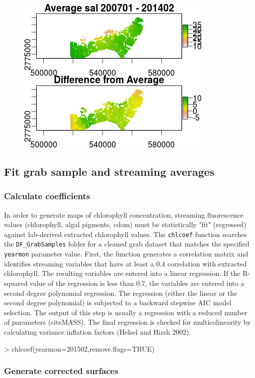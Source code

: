\documentclass[12pt]{article}
\begin{document}
\begin{figure}[H]
\begin{center}
\includegraphics{figure2}
\end{center}
\label{fig:two}
\end{figure}

\subsection{Fit grab sample and streaming averages}
\subsubsection{Calculate coefficients}

In order to generate maps of chlorophyll concentration, streaming fluorescence values (chlorophyll, algal pigments, cdom) must be statistically "fit" (regressed) against lab-derived extracted chlorophyll values. The \texttt{chlcoef} function searches the \verb|DF_GrabSamples| folder for a cleaned grab dataset that matches the specified \texttt{yearmon} parameter value. First, the function generates a correlation matrix and identifies streaming variables that have at least a 0.4 correlation with extracted chlorophyll. The resulting variables are entered into a linear regression. If the R-squared value of the regression is less than 0.7, the variables are entered into a second degree polynomial regression. The regression (either the linear or the second degree polynomial) is subjected to a backward stepwise AIC model selection. The output of this step is usually a regression with a reduced number of parameters (citeMASS). The final regression is checked for multicolinearity by calculating variance inflation factors (Helsel and Hirsh 2002).





\begin{Schunk}
\begin{Sinput}
> chlcoef(yearmon=201502,remove.flags=TRUE)
\end{Sinput}
\end{Schunk}

\subsubsection{Generate corrected surfaces}



\medskip
 

 
\end{document}
